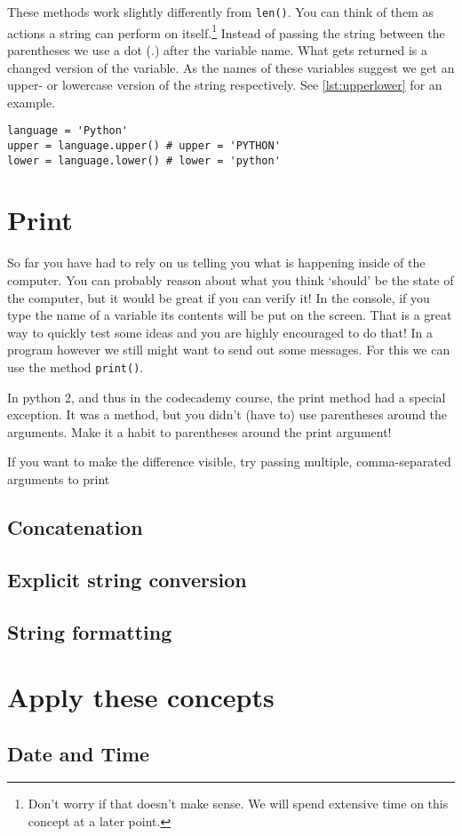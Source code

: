 	These methods work slightly differently from \lstinline|len()|.
	You can think of them as actions a string can perform on itself.\footnote{Don't worry if that doesn't make sense. We will spend extensive time on this concept at a later point.}
	Instead of passing the string between the parentheses we use a dot (.) after the variable name. 
	What gets returned is a changed version of the variable.
	As the names of these variables suggest we get an upper- or lowercase version of the string respectively.
	See \autoref{lst:upperlower} for an example.
	
	\begin{lstlisting}[caption={Getting the upper- and lowercase versions of a string.}, label={lst:upperlower}]
language = 'Python'
upper = language.upper() # upper = 'PYTHON'
lower = language.lower() # lower = 'python'
	\end{lstlisting}
	
	\section{Print}
	
	So far you have had to rely on us telling you what is happening inside of the computer.
	You can probably reason about what you think `should' be the state of the computer, but it would be great if you can verify it!
	In the console, if you type the name of a variable its contents will be put on the screen.
	That is a great way to quickly test some ideas and you are highly encouraged to do that!
	In a program however we still might want to send out some messages.
	For this we can use the method \lstinline|print()|.

	\begin{versiondifferences}
	In python 2, and thus in the codecademy course, the print method had a special exception.
	It was a method, but you didn't (have to) use parentheses around the arguments.
	Make it a habit to parentheses around the print argument!
	
	If you want to make the difference visible, try passing multiple, comma-separated arguments to print
	\end{versiondifferences}
	
		\subsection{Concatenation}
		
		\subsection{Explicit string conversion}
		
		
		\subsection{String formatting}
		
	\section{Apply these concepts}
	
		\subsection{Date and Time}
		
